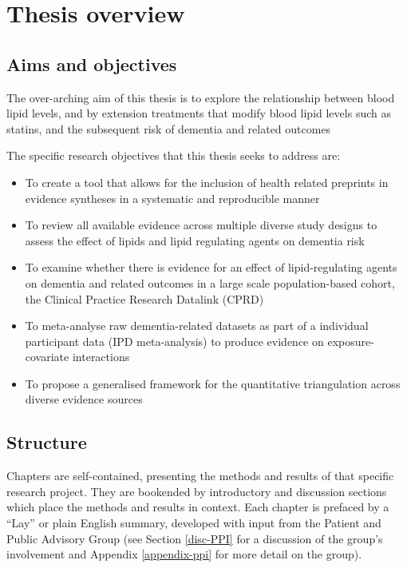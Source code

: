 \documentclass[a4paper, twoside]{templates/ociamthesis}
\providecommand{\tightlist}{%
  \setlength{\itemsep}{0pt}\setlength{\parskip}{0pt}}
\begin{document}
\hypertarget{background-thesis-overview}{%
\section{Thesis overview}\label{background-thesis-overview}}

\hypertarget{aims-and-objectives}{%
\subsection{Aims and objectives}\label{aims-and-objectives}}

The over-arching aim of this thesis is to explore the relationship between blood lipid levels, and by extension treatments that modify blood lipid levels such as statins, and the subsequent risk of dementia and related outcomes

The specific research objectives that this thesis seeks to address are:

\begin{itemize}
\tightlist
\item
  To create a tool that allows for the inclusion of health related preprints in evidence syntheses in a systematic and reproducible manner
\item
  To review all available evidence across multiple diverse study designs to assess the effect of lipids and lipid regulating agents on dementia risk
\item
  To examine whether there is evidence for an effect of lipid-regulating agents on dementia and related outcomes in a large scale population-based cohort, the Clinical Practice Research Datalink (CPRD)
\item
  To meta-analyse raw dementia-related datasets as part of a individual participant data (IPD meta-analysis) to produce evidence on exposure-covariate interactions
\item
  To propose a generalised framework for the quantitative triangulation across diverse evidence sources
\end{itemize}

\hypertarget{thesis-structure}{%
\subsection{Structure}\label{thesis-structure}}

Chapters are self-contained, presenting the methods and results of that specific research project. They are bookended by introductory and discussion sections which place the methods and results in context. Each chapter is prefaced by a ``Lay'' or plain English summary, developed with input from the Patient and Public Advisory Group (see Section \ref{disc-PPI} for a discussion of the group's involvement and Appendix \ref{appendix-ppi} for more detail on the group).
\end{document}
